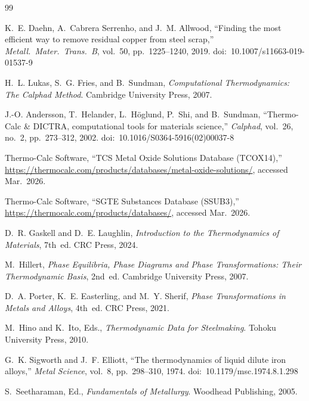 \documentclass[11pt]{article}
\begin{document}
\newpage
\begin{thebibliography}{99}

K.~E. Daehn, A.~Cabrera Serrenho, and J.~M. Allwood,
``Finding the most efficient way to remove residual copper from steel scrap,''
\textit{Metall.\ Mater.\ Trans.\ B}, vol.~50, pp.~1225--1240, 2019.
doi:~10.1007/s11663-019-01537-9

H.~L. Lukas, S.~G. Fries, and B.~Sundman,
\textit{Computational Thermodynamics: The Calphad Method}.
Cambridge University Press, 2007.

J.-O. Andersson, T.~Helander, L.~H\"{o}glund, P.~Shi, and B.~Sundman,
``Thermo-Calc \& DICTRA, computational tools for materials science,''
\textit{Calphad}, vol.~26, no.~2, pp.~273--312, 2002.
doi:~10.1016/S0364-5916(02)00037-8

Thermo-Calc Software,
``TCS Metal Oxide Solutions Database (TCOX14),''
\url{https://thermocalc.com/products/databases/metal-oxide-solutions/}, accessed Mar.\ 2026.

Thermo-Calc Software,
``SGTE Substances Database (SSUB3),''
\url{https://thermocalc.com/products/databases/}, accessed Mar.\ 2026.

D.~R. Gaskell and D.~E. Laughlin,
\textit{Introduction to the Thermodynamics of Materials}, 7th~ed.
CRC Press, 2024.

M.~Hillert,
\textit{Phase Equilibria, Phase Diagrams and Phase Transformations: Their Thermodynamic Basis}, 2nd~ed.
Cambridge University Press, 2007.

D.~A. Porter, K.~E. Easterling, and M.~Y. Sherif,
\textit{Phase Transformations in Metals and Alloys}, 4th~ed.
CRC Press, 2021.

M.~Hino and K.~Ito, Eds.,
\textit{Thermodynamic Data for Steelmaking}.
Tohoku University Press, 2010.

G.~K. Sigworth and J.~F. Elliott,
``The thermodynamics of liquid dilute iron alloys,''
\textit{Metal Science}, vol.~8, pp.~298--310, 1974.
doi:~10.1179/msc.1974.8.1.298

S.~Seetharaman, Ed.,
\textit{Fundamentals of Metallurgy}.
Woodhead Publishing, 2005.


\end{thebibliography}
\end{document}

